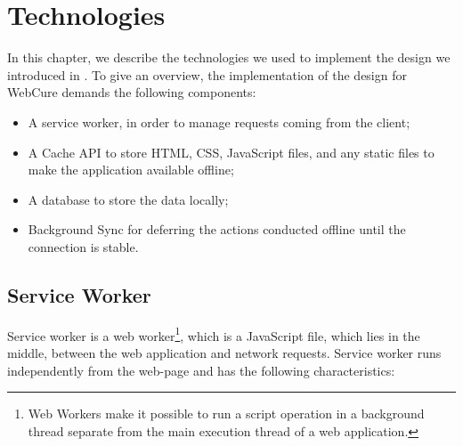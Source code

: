 \chapter{Technologies}
\label{Technologies}

In this chapter, we describe the technologies we used to implement the design we introduced in . To give an overview, the implementation of the design for WebCure demands the following components:

\begin{itemize}
\item{A service worker, in order to manage requests coming from the client;}
\item{A Cache API to store HTML, CSS, JavaScript files, and any static files\cite{41} to make the application available offline;}
\item{A database to store the data locally;}
\item{Background Sync for deferring the actions conducted offline until the connection is stable.}

\end{itemize}


\section{Service Worker}

Service worker\cite{1} is a web worker\footnote{Web Workers make it possible to run a script operation in a background thread separate from the main execution thread of a web application\cite{30}.}, which is a JavaScript file, which lies in the middle, between the web application and network requests. Service worker runs independently from the web-page and has the following characteristics: 

